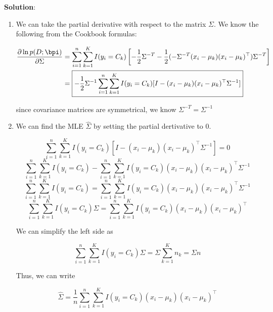 \documentclass[submit]{../harvardml}
\newenvironment{solution}{
    \vspace{2mm}
    \color{blue}\noindent\textbf{Solution}:
}{}
\begin{document}
\begin{solution}
\begin{enumerate}
    \item We can take the partial derivative with respect to the matrix $\Sigma$. We know the following from the Cookbook formulas:

    \begin{align*}
        \frac{\partial\ln p(D;\bpi)}{\partial \Sigma} &= \sum_{i=1}^n \sum_{k=1}^K I(y_i = C_k)\left[-\frac{1}{2} \Sigma^{-T}-\frac{1}{2}(-\Sigma^{-T}(x_i - \mu_k)(x_i - \mu_k)^\top) \Sigma^{-T}\right] \\
        &= \boxed{-\frac{1}{2}\Sigma^{-1} \sum_{i=1}^n \sum_{k=1}^K I(y_i = C_k) [I - (x_i-\mu_k)(x_i - \mu_k)^\top \Sigma^{-1}]}
    \end{align*}

    since covariance matrices are symmetrical, we know $\Sigma^{-T} = \Sigma^{-1}$

    \item We can find the MLE $\hat{\Sigma}$ by setting the partial dertivative to 0.

    \[
    \sum_{i=1}^n \sum_{k=1}^K I(y_i = C_k) [I - (x_i-\mu_k)(x_i - \mu_k)^\top \Sigma^{-1}] = 0
    \]
    \[
    \sum_{i=1}^n \sum_{k=1}^K I(y_i = C_k)- \sum_{i=1}^n \sum_{k=1}^KI(y_i = C_k) (x_i-\mu_k)(x_i - \mu_k)^\top \Sigma^{-1}
    \]
    \[
    \sum_{i=1}^n \sum_{k=1}^K I(y_i = C_k) = \sum_{i=1}^n \sum_{k=1}^KI(y_i = C_k) (x_i-\mu_k)(x_i - \mu_k)^\top \Sigma^{-1}
    \]
    \[
    \sum_{i=1}^n \sum_{k=1}^K I(y_i = C_k) \Sigma= \sum_{i=1}^n \sum_{k=1}^KI(y_i = C_k) (x_i-\mu_k)(x_i - \mu_k)^\top 
    \]

    We can simplify the left side as

    \[
    \sum_{i=1}^n \sum_{k=1}^K I(y_i = C_k) \Sigma = \Sigma \sum_{k=1}^K n_k = \Sigma n
    \]

    Thus, we can write

    \[
    \boxed{\hat{\Sigma} = \frac{1}{n} \sum_{i=1}^n \sum_{k=1}^KI(y_i = C_k) (x_i-\mu_k)(x_i - \mu_k)^\top }
    \]
    
\end{enumerate}

\end{solution}
\end{document}

